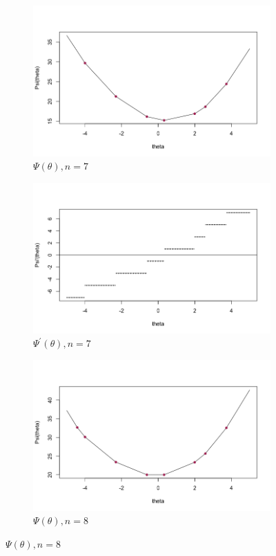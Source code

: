 \documentclass[11pt]{article}
\begin{document}
\begin{figure}[h]
     \centering
     \begin{subfigure}[b]{0.48\textwidth}
         \centering
         \includegraphics[width=\textwidth]{fig/hw4-1.png}
         \caption{$\Psi(\theta), n = 7$}

     \end{subfigure}
     \hfill
     \begin{subfigure}[b]{0.48\textwidth}
         \centering
         \includegraphics[width=\textwidth]{fig/hw4-2.png}
         \caption{$\Psi^{'}(\theta), n = 7$}

     \end{subfigure}
          \begin{subfigure}[b]{0.48\textwidth}
         \centering
         \includegraphics[width=\textwidth]{fig/hw4-3.png}
         \caption{$\Psi(\theta), n = 8$}


\end{subfigure}
\end{figure}
\end{document}
